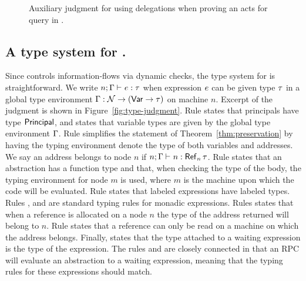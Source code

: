 \begin{figure}
    \centering
    \caption{Auxiliary judgment for using delegations when proving an acts for query in \lang.}
    \label{fig:act-for-judgment-del}
\end{figure}

\subsection{A type system for \lang.}
Since \lang{} controls information-flows via dynamic checks, the type system for \lang{} is straightforward. We write $\hastype{n; \tenv}{\expr}{\type}$ when expression $e$ can be given type $\tau$ in a global type environment $\Gamma: \mathcal{N} \to (\mathsf{Var} \to \tau)$ on machine $n$. Excerpt of the judgment is shown in Figure~\ref{fig:type-judgment}. Rule  states that principals have type $\mathsf{Principal}$, and  states that variable types are given by the global type environment $\Gamma$. Rule  simplifies the statement of Theorem~\ref{thm:preservation} by having the typing environment denote the type of both variables and addresses. We say an address belongs to node $n$ if $\hastype{n; \tenv}{n}{\reftype[n]{\type}}$. Rule  states that an abstraction has a function type and that, when checking the type of the body, the typing environment for node $m$ is used, where $m$ is the machine upon which the code will be evaluated. Rule  states that labeled expressions have labeled types. Rules ,  and  are standard typing rules for monadic expressions. Rules  states that when a reference is allocated on a node $n$ the type of the address returned will belong to $n$. Rule  states that a reference can only be read on a machine on which the address belongs. Finally,  states that the type attached to a waiting expression is the type of the expression. The rules  and  are closely connected in that an RPC will evaluate an abstraction to a waiting expression, meaning that the typing rules for these expressions should match.

